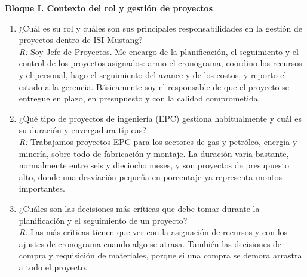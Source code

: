 \documentclass{univalle-perfil}
\begin{document}
\vspace{0.5\baselineskip}
\noindent\textbf{Bloque I. Contexto del rol y gestión de proyectos}
\begin{enumerate}\setlength{\itemsep}{6pt}\setlength{\parskip}{0pt}
  \item ¿Cuál es su rol y cuáles son sus principales responsabilidades en la gestión de proyectos dentro de ISI Mustang?\\
  \textit{R:} Soy Jefe de Proyectos. Me encargo de la planificación, el seguimiento y el control de los proyectos asignados: armo el cronograma, coordino los recursos y el personal, hago el seguimiento del avance y de los costos, y reporto el estado a la gerencia. Básicamente soy el responsable de que el proyecto se entregue en plazo, en presupuesto y con la calidad comprometida.

  \item ¿Qué tipo de proyectos de ingeniería (EPC) gestiona habitualmente y cuál es su duración y envergadura típicas?\\
  \textit{R:} Trabajamos proyectos EPC para los sectores de gas y petróleo, energía y minería, sobre todo de fabricación y montaje. La duración varía bastante, normalmente entre seis y dieciocho meses, y son proyectos de presupuesto alto, donde una desviación pequeña en porcentaje ya representa montos importantes.

  \item ¿Cuáles son las decisiones más críticas que debe tomar durante la planificación y el seguimiento de un proyecto?\\
  \textit{R:} Las más críticas tienen que ver con la asignación de recursos y con los ajustes de cronograma cuando algo se atrasa. También las decisiones de compra y requisición de materiales, porque si una compra se demora arrastra a todo el proyecto.
\end{enumerate}
\end{document}
